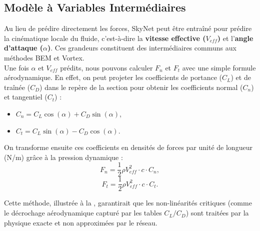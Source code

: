 \documentclass[11pt, a4paper]{article}
\begin{document}
\subsection{Modèle à Variables Intermédiaires}

Au lieu de prédire directement les forces, SkyNet peut être entraîné pour prédire la cinématique locale du fluide, c'est-à-dire la \textbf{vitesse effective ($V_{eff}$)} et l'\textbf{angle d'attaque ($\alpha$)}. Ces grandeurs constituent des intermédiaires communs aux méthodes BEM et Vortex.\\

Une fois $\alpha$ et $V_{eff}$ prédits, nous pouvons calculer $F_n$ et $F_t$ avec une simple formule aérodynamique. En effet, on peut projeter les coefficients de portance ($C_L$) et de traînée ($C_D$) dans le repère de la section pour obtenir les coefficients normal ($C_n$) et tangentiel ($C_t$) :
\begin{itemize}
    \item $C_n = C_L \cos(\alpha) + C_D \sin(\alpha)$,
    \item $C_t = C_L \sin(\alpha) - C_D \cos(\alpha)$.
\end{itemize}

On transforme ensuite ces coefficients en densités de forces par unité de longueur (N/m) grâce à la pression dynamique :
$$F_n = \frac{1}{2} \rho V_{eff}^2 \cdot c \cdot C_n,$$
$$F_t = \frac{1}{2} \rho V_{eff}^2 \cdot c \cdot C_t.$$

Cette méthode, illustrée à la , garantirait que les non-linéarités critiques (comme le décrochage aérodynamique capturé par les tables $C_L/C_D$) sont traitées par la physique exacte et non approximées par le réseau.
\end{document}

